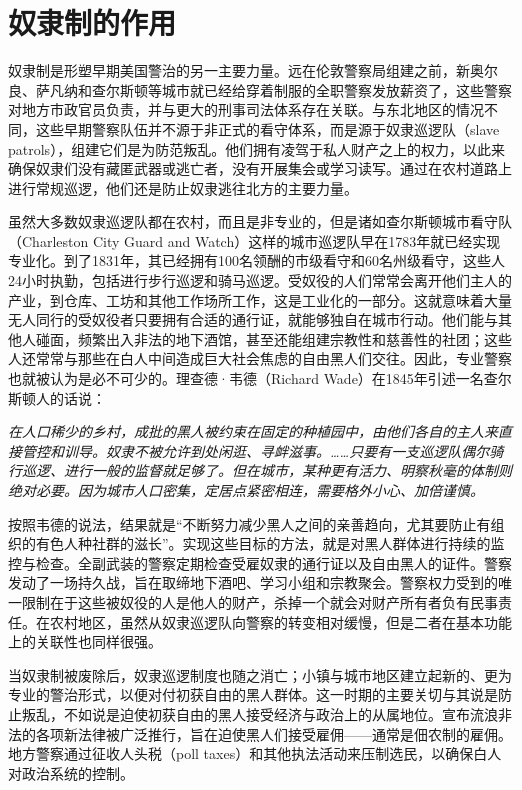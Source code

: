 \documentclass[fontset=fandol, a4paper, 12pt, openright]{ctexbook}
\renewenvironment{quote}
  {\list{}{\rightmargin\leftmargin}%
   \item\relax\small\itshape\color{black}}
  {\endlist}
\begin{document}
\section{奴隶制的作用}

奴隶制是形塑早期美国警治的另一主要力量。远在伦敦警察局组建之前，新奥尔良、萨凡纳和查尔斯顿等城市就已经给穿着制服的全职警察发放薪资了，这些警察对地方市政官员负责，并与更大的刑事司法体系存在关联。与东北地区的情况不同，这些早期警察队伍并不源于非正式的看守体系，而是源于奴隶巡逻队（slave patrols），组建它们是为防范叛乱。他们拥有凌驾于私人财产之上的权力，以此来确保奴隶们没有藏匿武器或逃亡者，没有开展集会或学习读写。通过在农村道路上进行常规巡逻，他们还是防止奴隶逃往北方的主要力量。

虽然大多数奴隶巡逻队都在农村，而且是非专业的，但是诸如查尔斯顿城市看守队（Charleston City Guard and Watch）这样的城市巡逻队早在1783年就已经实现专业化。到了1831年，其已经拥有100名领酬的市级看守和60名州级看守，这些人24小时执勤，包括进行步行巡逻和骑马巡逻。受奴役的人们常常会离开他们主人的产业，到仓库、工坊和其他工作场所工作，这是工业化的一部分。这就意味着大量无人同行的受奴役者只要拥有合适的通行证，就能够独自在城市行动。他们能与其他人碰面，频繁出入非法的地下酒馆，甚至还能组建宗教性和慈善性的社团；这些人还常常与那些在白人中间造成巨大社会焦虑的自由黑人们交往。因此，专业警察也就被认为是必不可少的。理查德·韦德（Richard Wade）在1845年引述一名查尔斯顿人的话说：

\begin{quote}
在人口稀少的乡村，成批的黑人被约束在固定的种植园中，由他们各自的主人来直接管控和训导。奴隶不被允许到处闲逛、寻衅滋事。……只要有一支巡逻队偶尔骑行巡逻、进行一般的监督就足够了。但在城市，某种更有活力、明察秋毫的体制则绝对必要。因为城市人口密集，定居点紧密相连，需要格外小心、加倍谨慎。
\end{quote}

按照韦德的说法，结果就是“不断努力减少黑人之间的亲善趋向，尤其要防止有组织的有色人种社群的滋长”。实现这些目标的方法，就是对黑人群体进行持续的监控与检查。全副武装的警察定期检查受雇奴隶的通行证以及自由黑人的证件。警察发动了一场持久战，旨在取缔地下酒吧、学习小组和宗教聚会。警察权力受到的唯一限制在于这些被奴役的人是他人的财产，杀掉一个就会对财产所有者负有民事责任。在农村地区，虽然从奴隶巡逻队向警察的转变相对缓慢，但是二者在基本功能上的关联性也同样很强。

当奴隶制被废除后，奴隶巡逻制度也随之消亡；小镇与城市地区建立起新的、更为专业的警治形式，以便对付初获自由的黑人群体。这一时期的主要关切与其说是防止叛乱，不如说是迫使初获自由的黑人接受经济与政治上的从属地位。宣布流浪非法的各项新法律被广泛推行，旨在迫使黑人们接受雇佣——通常是佃农制的雇佣。地方警察通过征收人头税（poll taxes）和其他执法活动来压制选民，以确保白人对政治系统的控制。
\end{document}

